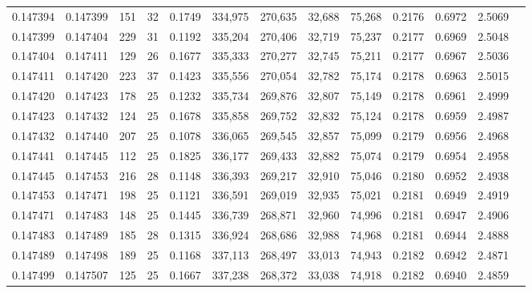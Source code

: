\begin{tabular}{rrrrrrrrrrrrr}
0.147394 & 0.147399 & 151 &  32 &                                     0.1749 & 334,975 & 270,635 &  32,688 &  75,268 & 0.2176 & 0.6972 & 2.5069 \\
0.147399 & 0.147404 & 229 &  31 &                                     0.1192 & 335,204 & 270,406 &  32,719 &  75,237 & 0.2177 & 0.6969 & 2.5048 \\
0.147404 & 0.147411 & 129 &  26 &                                     0.1677 & 335,333 & 270,277 &  32,745 &  75,211 & 0.2177 & 0.6967 & 2.5036 \\
0.147411 & 0.147420 & 223 &  37 &                                     0.1423 & 335,556 & 270,054 &  32,782 &  75,174 & 0.2178 & 0.6963 & 2.5015 \\
0.147420 & 0.147423 & 178 &  25 &                                     0.1232 & 335,734 & 269,876 &  32,807 &  75,149 & 0.2178 & 0.6961 & 2.4999 \\
0.147423 & 0.147432 & 124 &  25 &                                     0.1678 & 335,858 & 269,752 &  32,832 &  75,124 & 0.2178 & 0.6959 & 2.4987 \\
0.147432 & 0.147440 & 207 &  25 &                                     0.1078 & 336,065 & 269,545 &  32,857 &  75,099 & 0.2179 & 0.6956 & 2.4968 \\
0.147441 & 0.147445 & 112 &  25 &                                     0.1825 & 336,177 & 269,433 &  32,882 &  75,074 & 0.2179 & 0.6954 & 2.4958 \\
0.147445 & 0.147453 & 216 &  28 &                                     0.1148 & 336,393 & 269,217 &  32,910 &  75,046 & 0.2180 & 0.6952 & 2.4938 \\
0.147453 & 0.147471 & 198 &  25 &                                     0.1121 & 336,591 & 269,019 &  32,935 &  75,021 & 0.2181 & 0.6949 & 2.4919 \\
0.147471 & 0.147483 & 148 &  25 &                                     0.1445 & 336,739 & 268,871 &  32,960 &  74,996 & 0.2181 & 0.6947 & 2.4906 \\
0.147483 & 0.147489 & 185 &  28 &                                     0.1315 & 336,924 & 268,686 &  32,988 &  74,968 & 0.2181 & 0.6944 & 2.4888 \\
0.147489 & 0.147498 & 189 &  25 &                                     0.1168 & 337,113 & 268,497 &  33,013 &  74,943 & 0.2182 & 0.6942 & 2.4871 \\
0.147499 & 0.147507 & 125 &  25 &                                     0.1667 & 337,238 & 268,372 &  33,038 &  74,918 & 0.2182 & 0.6940 & 2.4859 \\

\end{tabular}
